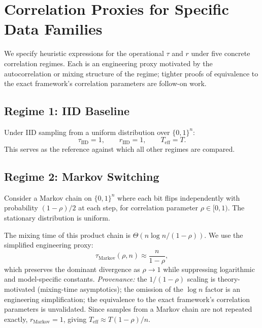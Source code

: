 \documentclass[sensors,article,submit,pdftex,moreauthors]{Definitions/mdpi}
\newcommand{\Teff}{T_{\mathrm{eff}}}
\begin{document}
\section{Correlation Proxies for Specific Data Families}
\label{sec:theory}

We specify heuristic expressions for the operational $\tau$ and $r$ under five concrete correlation regimes. Each is an engineering proxy motivated by the autocorrelation or mixing structure of the regime; tighter proofs of equivalence to the exact framework's correlation parameters are follow-on work.

\subsection{Regime 1: IID Baseline}

Under IID sampling from a uniform distribution over $\{0,1\}^n$:
\begin{equation}
    \tau_{\text{IID}} = 1, \qquad r_{\text{IID}} = 1, \qquad \Teff = T.
\end{equation}
This serves as the reference against which all other regimes are compared.

\subsection{Regime 2: Markov Switching}

Consider a Markov chain on $\{0,1\}^n$ where each bit flips independently with probability $(1 - \rho)/2$ at each step, for correlation parameter $\rho \in [0, 1)$. The stationary distribution is uniform.

The mixing time of this product chain is $\Theta(n \log n / (1 - \rho))$. We use the simplified engineering proxy:
\begin{equation}
    \tau_{\text{Markov}}(\rho, n) \approx \frac{n}{1 - \rho},
    \label{eq:tau_markov}
\end{equation}
which preserves the dominant divergence as $\rho \to 1$ while suppressing logarithmic and model-specific constants. \emph{Provenance:} the $1/(1{-}\rho)$ scaling is theory-motivated (mixing-time asymptotics); the omission of the $\log n$ factor is an engineering simplification; the equivalence to the exact framework's correlation parameters is unvalidated. Since samples from a Markov chain are not repeated exactly, $r_{\text{Markov}} = 1$, giving $\Teff \approx T(1{-}\rho)/n$.
\end{document}
